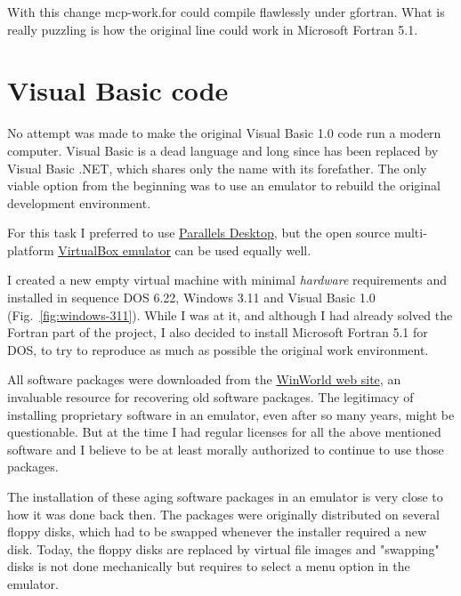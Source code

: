 With this change \textsf{mcp-work.for} could compile flawlessly under gfortran.
What is really puzzling is how the original line could work in Microsoft Fortran 5.1.



\section{Visual Basic code}
\label{visual-basic-code}

No attempt was made to make the original Visual Basic 1.0 code run a modern computer. Visual Basic is a dead language and long since has been replaced by Visual Basic .NET, which shares only the name with its forefather. The only viable option from the beginning was to use an emulator to rebuild the original development environment.

For this task I preferred to use \href{https://www.parallels.com/}{Parallels Desktop}, but the open source multi-platform \href{https://www.virtualbox.org/}{VirtualBox emulator} can be used equally well.

I created a new empty virtual machine with minimal \emph{hardware} requirements and installed in sequence DOS 6.22, Windows 3.11 and Visual Basic 1.0 (Fig.~\ref{fig:windows-311}).
While I was at it, and although I had already solved the Fortran part of the project, I also decided to install Microsoft Fortran 5.1 for DOS, to try to reproduce as much as possible the original work environment.

All software packages were downloaded from the \href{https://winworldpc.com}{WinWorld web site}, an invaluable resource for recovering old software packages. 
The legitimacy of installing proprietary software in an emulator, even after so many years, might be questionable. But at the time I had regular licenses for all the above mentioned software and I believe to be at least morally authorized to continue to use those packages.

The installation of these aging software packages in an emulator is very close to how it was done back then.
The packages were originally distributed on several floppy disks, which had to be swapped whenever the installer required a new disk. Today, the floppy disks are replaced by virtual file images and "swapping" disks is not done mechanically but requires to select a menu option in the emulator.

